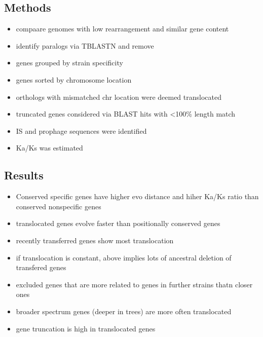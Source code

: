 \documentclass[10pt,letter]{article}
\begin{document}
\subsection*{Methods}
\begin{itemize}
    \item compaare genomes with low rearrangement and similar gene content
    \item identify paralogs via TBLASTN and remove
    \item genes grouped by strain specificity
    \item genes sorted by chromosome location
    \item orthologs with mismatched chr location were deemed translocated
    \item truncated genes considered via BLAST hits with <100\% length match
    \item IS and prophage sequences were identified
    \item Ka/Ks was estimated
\end{itemize}
\subsection*{Results}
\begin{itemize}
    \item Conserved specific genes have higher evo distance and hiher Ka/Ks ratio than conserved nonspecific genes
    \item translocated genes evolve faster than positionally conserved genes
    \item recently transferred genes show most translocation
    \item if translocation is constant, above implies lots of ancestral deletion of transfered genes
    \item excluded genes that are more related to genes in further strains  thatn closer ones
    \item broader spectrum genes (deeper in trees)  are more often translocated
    \item gene truncation is high in translocated genes
\end{itemize}
\end{document}
